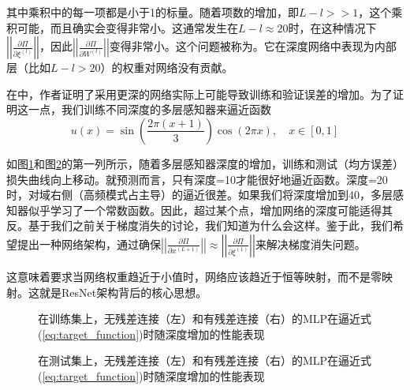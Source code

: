 其中乘积中的每一项都是小于1的标量。随着项数的增加，即$L - l >> 1$，这个乘积可能，而且确实会变得非常小。这通常发生在$L - l \approx 20$时，在这种情况下$\left|\left|\frac{\partial\Pi}{\partial\xi^{(l)}}\right|\right|$，因此$\left|\left|\frac{\partial\Pi}{\partial W^{(l)}}\right|\right|$变得非常小。这个问题被称为。它在深度网络中表现为内部层（比如$L - l > 20$）的权重对网络没有贡献。

在\cite{he2015}中，作者证明了采用更深的网络实际上可能导致训练和验证误差的增加。为了证明这一点，我们训练不同深度的多层感知器来逼近函数
\begin{equation}
u(x) = \sin\left(\frac{2\pi(x + 1)}{3}\right) \cos(2\pi x), \quad x \in [0, 1]
\label{eq:target_function}
\end{equation}

如图\ref{fig:mlp_performance_train}和图\ref{fig:mlp_performance_test}的第一列所示，随着多层感知器深度的增加，训练和测试（均方误差）损失曲线向上移动。就预测而言，只有深度=10才能很好地逼近函数。深度=20时，对域右侧（高频模式占主导）的逼近很差。如果我们将深度增加到40，多层感知器似乎学习了一个常数函数。因此，超过某个点，增加网络的深度可能适得其反。基于我们之前关于梯度消失的讨论，我们知道为什么会这样。鉴于此，我们希望提出一种网络架构，通过确保$\left|\left|\frac{\partial\Pi}{\partial x^{(L+1)}}\right|\right| \approx \left|\left|\frac{\partial\Pi}{\partial\xi^{(1)}}\right|\right|$来解决梯度消失问题。

这意味着要求当网络权重趋近于小值时，网络应该趋近于恒等映射，而不是零映射。这就是ResNet架构背后的核心思想。

\begin{figure}[H]
\centering
\caption{在训练集上，无残差连接（左）和有残差连接（右）的MLP在逼近式(\ref{eq:target_function})时随深度增加的性能表现}
\label{fig:mlp_performance_train}
\end{figure}

\begin{figure}[H]
\centering
\caption{在测试集上，无残差连接（左）和有残差连接（右）的MLP在逼近式(\ref{eq:target_function})时随深度增加的性能表现}
\label{fig:mlp_performance_test}
\end{figure}

